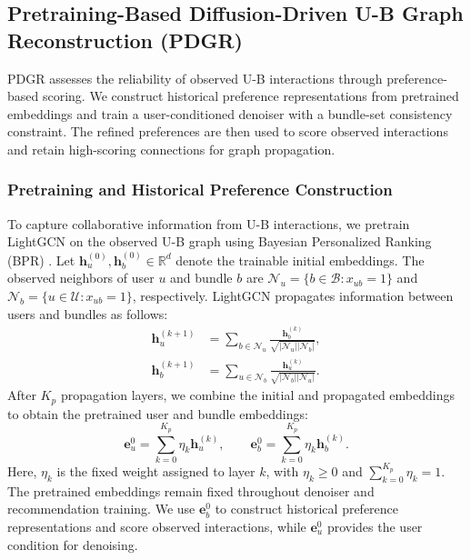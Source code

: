 \documentclass[letterpaper]{article}
\begin{document}
\subsection{Pretraining-Based Diffusion-Driven U-B Graph Reconstruction (PDGR)}\label{sec:graph-reconstruction}

PDGR assesses the reliability of observed U-B interactions through preference-based scoring. We construct historical preference representations from pretrained embeddings and train a user-conditioned denoiser with a bundle-set consistency constraint. The refined preferences are then used to score observed interactions and retain high-scoring connections for graph propagation.

\subsubsection{Pretraining and Historical Preference Construction}

To capture collaborative information from U-B interactions, we pretrain LightGCN \cite{he2020lightgcn} on the observed U-B graph using Bayesian Personalized Ranking (BPR) \cite{rendle2009bpr}. Let $\mathbf h_u^{(0)},\mathbf h_b^{(0)}\in\mathbb R^d$ denote the trainable initial embeddings. The observed neighbors of user $u$ and bundle $b$ are $\mathcal N_u=\{b\in\mathcal B:x_{ub}=1\}$ and $\mathcal N_b=\{u\in\mathcal U:x_{ub}=1\}$, respectively. LightGCN propagates information between users and bundles as follows:
\begin{equation}
\begin{aligned}
\mathbf h_u^{(k+1)}
&=\sum_{b\in\mathcal N_u}
\frac{\mathbf h_b^{(k)}}
{\sqrt{|\mathcal N_u||\mathcal N_b|}},\\
\mathbf h_b^{(k+1)}
&=\sum_{u\in\mathcal N_b}
\frac{\mathbf h_u^{(k)}}
{\sqrt{|\mathcal N_b||\mathcal N_u|}}.
\end{aligned}
\tag{1}
\end{equation}
After $K_p$ propagation layers, we combine the initial and propagated embeddings to obtain the pretrained user and bundle embeddings:
\begin{equation}
\mathbf e_u^0=\sum_{k=0}^{K_p}\eta_k\mathbf h_u^{(k)},
\qquad
\mathbf e_b^0=\sum_{k=0}^{K_p}\eta_k\mathbf h_b^{(k)}.
\tag{2}
\end{equation}
Here, $\eta_k$ is the fixed weight assigned to layer $k$, with $\eta_k\geq0$ and $\sum_{k=0}^{K_p}\eta_k=1$.
The pretrained embeddings remain fixed throughout denoiser and recommendation training. We use $\mathbf e_b^0$ to construct historical preference representations and score observed interactions, while $\mathbf e_u^0$ provides the user condition for denoising.
\end{document}
